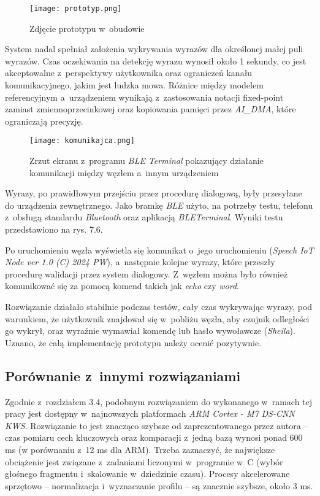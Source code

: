 \begin{figure}[h]
	\centering
	\texttt{[image: prototyp.png]}
	\caption{Zdjęcie prototypu w~obudowie}
\end{figure}
\FloatBarrier %



System nadal spełniał założenia wykrywania wyrazów dla określonej małej puli wyrazów. Czas oczekiwania na detekcję wyrazu wynosił około 1 sekundy, co jest akceptowalne z~perspektywy użytkownika oraz ograniczeń kanału komunikacyjnego, jakim jest ludzka mowa. Różnice między modelem referencyjnym a~urządzeniem wynikają z~zastosowania notacji fixed-point zamiast zmiennoprzecinkowej oraz kopiowania pamięci przez \textit{AI\_DMA}, które ograniczają precyzję.

\begin{figure}[h]
	\centering
	\texttt{[image: komunikajca.png]}
	\caption{Zrzut ekranu z~programu \textit{BLE Terminal} pokazujący działanie komunikacji między węzłem a~innym urządzeniem}
\end{figure}
\FloatBarrier %

Wyrazy, po prawidłowym przejściu przez procedurę dialogową, były przesyłane do urządzenia zewnętrznego. Jako bramkę \textit{BLE} użyto, na potrzeby testu, telefonu z~obsługą standardu \textit{Bluetooth} oraz aplikacją \textit{BLETerminal}. Wyniki testu przedstawiono na rys. 7.6.

Po uruchomieniu węzła wyświetla się komunikat o~jego uruchomieniu (\textit{Speech IoT Node ver 1.0 (C) 2024 PW}), a~następnie kolejne wyrazy, które przeszły procedurę walidacji przez system dialogowy. Z~węzłem można było również komunikować się za pomocą komend takich jak \textit{echo} czy \textit{word}.

Rozwiązanie działało stabilnie podczas testów, cały czas wykrywając wyrazy, pod warunkiem, że użytkownik znajdował się w~pobliżu węzła, aby czujnik odległości go wykrył, oraz wyraźnie wymawiał komendę lub hasło wywoławcze (\textit{Sheila}). Uznano, że całą implementację prototypu należy ocenić pozytywnie.


\subsection{Porównanie z~innymi rozwiązaniami}

Zgodnie z~rozdziałem 3.4, podobnym rozwiązaniem do wykonanego w~ramach tej pracy jest dostępny w~najnowszych platformach \textit{ARM Cortex - M7} \textit{DS-CNN KWS}. Rozwiązanie to jest znacząco szybsze od zaprezentowanego przez autora – czas pomiaru cech kluczowych oraz komparacji z~jedną bazą wynosi ponad 600 ms (w porównaniu z~12 ms dla ARM). Trzeba zaznaczyć, że największe obciążenie jest związane z~zadaniami liczonymi w~programie w~C (wybór głośnego fragmentu i~skalowanie w~dziedzinie czasu). Procesy akcelerowane sprzętowo – normalizacja i~wyznaczanie profilu – są znacznie szybsze, około 3 ms.

